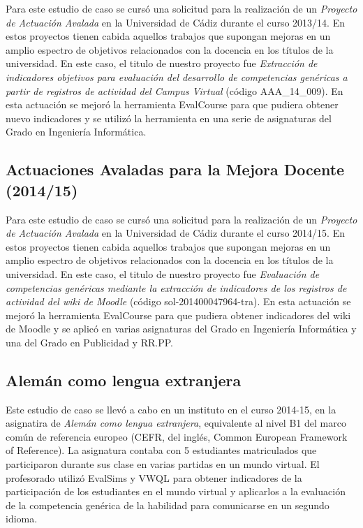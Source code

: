 		Para este estudio de caso se cursó una solicitud para la realización de un \emph{Proyecto de Actuación Avalada} en la Universidad de Cádiz durante el curso 2013/14. En estos proyectos tienen cabida aquellos trabajos que supongan mejoras en un amplio espectro de objetivos relacionados con la docencia en los títulos de la universidad. En este caso, el titulo de nuestro proyecto fue \emph{Extracción de indicadores objetivos para evaluación del desarrollo de competencias genéricas a partir de registros de actividad del Campus Virtual} (código AAA\_14\_009). En esta actuación se mejoró la herramienta EvalCourse para que pudiera obtener nuevo indicadores y se utilizó la herramienta en una serie de asignaturas del Grado en Ingeniería Informática. 

	\subsection{Actuaciones Avaladas para la Mejora Docente (2014/15)}

		Para este estudio de caso se cursó una solicitud para la realización de un \emph{Proyecto de Actuación Avalada} en la Universidad de Cádiz durante el curso 2014/15. En estos proyectos tienen cabida aquellos trabajos que supongan mejoras en un amplio espectro de objetivos relacionados con la docencia en los títulos de la universidad. En este caso, el titulo de nuestro proyecto fue \emph{Evaluación de competencias genéricas mediante la extracción de indicadores de los registros de actividad del wiki de Moodle} (código sol-201400047964-tra). En esta actuación se mejoró la herramienta EvalCourse para que pudiera obtener indicadores del wiki de Moodle y se aplicó en varias asignaturas del Grado en Ingeniería Informática y una del Grado en Publicidad y RR.PP. 

		

	\subsection{Alemán como lengua extranjera}

		Este estudio de caso se llevó a cabo en un instituto en el curso 2014-15, en la asignatira de \emph{Alemán como lengua extranjera}, equivalente al nivel B1 del marco común de referencia europeo (CEFR, del inglés, Common European Framework of Reference). La asignatura contaba con 5 estudiantes matriculados que participaron durante sus clase en varias partidas en un mundo virtual. El profesorado utilizó EvalSims y VWQL para obtener indicadores de la participación de los estudiantes en el mundo virtual y aplicarlos a la evaluación de la competencia genérica de la habilidad para comunicarse en un segundo idioma.

